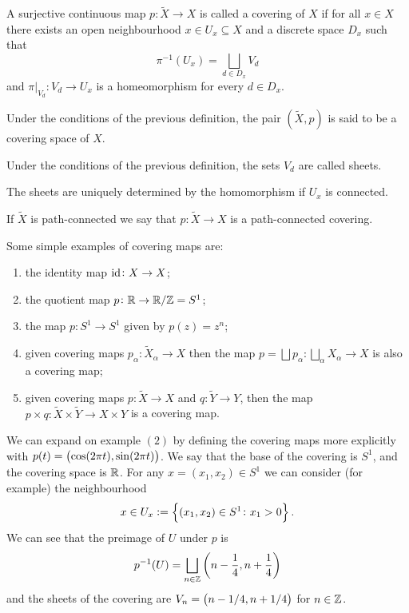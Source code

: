 \documentclass[11pt,a4paper]{article}
\begin{document}
\begin{definition}[Covering]
  A surjective continuous map $p \colon \widetilde X \to X$ is called a
  covering of $X$ if for all $x \in X$ there exists an open neighbourhood
  $x \in U_x \subseteq X$ and a discrete space $D_x$ such that
  \[
    \pi^{-1}(U_x) = \bigsqcup_{d \in D_x} V_d
  \]
  and $\pi\vert_{V_d} \colon V_d \to U_x$ is a homeomorphism for every
  $d \in D_x$.
\end{definition}
\begin{definition}
  Under the conditions of the previous definition,
  the pair $(\widetilde X, p)$ is said to be a covering space of $X$.
\end{definition}
\begin{definition}[Sheet]
  Under the conditions of the previous definition,
  the sets $V_d$ are called sheets.
\end{definition}
\begin{remark}
  The sheets are uniquely determined by the homomorphism if $U_x$ is connected.
\end{remark}
\begin{remark}
  If $\widetilde X$ is path-connected we say that $p \colon \widetilde X \to X$
  is a path-connected covering.
\end{remark}

\noindent Some simple examples of covering maps are:
\begin{enumerate}
  \item[(1)] the identity map $\operatorname{id} \colon X \to X$;
  \item[(2)] the quotient map $p \colon \mathbb{R} \to \mathbb{R} / \mathbb{Z} = S^1$;
  \item[(3)] the map $p \colon S^1 \to S^1$ given by $p(z) = z^n$;
  \item[(4)] given covering maps $p_{\alpha} \colon \widetilde X_{\alpha} \to X$
    then the map $p =
    \bigsqcup p_{\alpha} \colon \bigsqcup_{\alpha} X_{\alpha} \to X$ is also
    a covering map;
  \item[(5)] given covering maps $p \colon \widetilde X \to X$ and
    $q \colon \widetilde Y \to Y$, then the map
    $p \times q \colon \widetilde X \times \widetilde Y \to X \times Y$
    is a covering map.
\end{enumerate}

\begin{example}
  We can expand on example $(2)$ by defining the covering maps more explicitly
  with $p(t) = \del{\cos(2 \pi t), \sin(2 \pi t)}$.
  We say that the base of the covering is $S^1$,
  and the covering space is $\mathbb{R}$.
  For any $x = (x_1,x_2) \in S^1$ we can consider (for example)
  the neighbourhood
  \[
    x \in U_x := \left\{(x_1,x_2) \in S^1 \colon x_1 > 0\right\}.
  \]
  We can see that the preimage of $U$ under $p$ is
  \[
    p^{-1}(U) = \bigsqcup_{n \in \Z} \del{n - \frac{1}{4}, n + \frac{1}{4}}
  \]
  and the sheets of the covering are $V_n = \del{n - 1/4, n + 1/4}$
  for $n \in \mathbb{Z}$.
\end{example}
\end{document}
